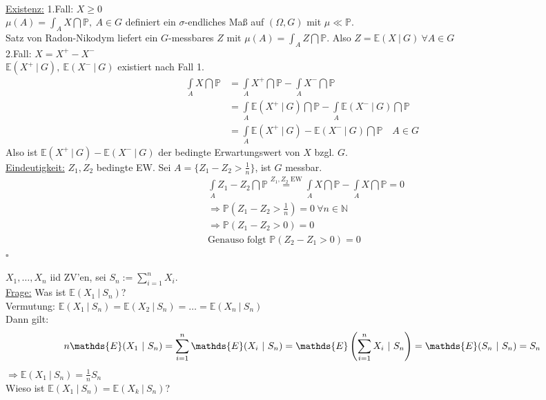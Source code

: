 \\
\uline{Existenz:} 1.Fall: $X\ge 0$\\
$\mu(A)=\int_AX\dint\mathds{P},~A\in G$ definiert ein $\sigma$-endliches Maß auf $(\Omega,G)$ mit $\mu \ll \mathds{P}$.\\
Satz von Radon-Nikodym liefert ein $G$-messbares $Z$ mit $\mu(A)=\int_A Z\dint\mathds{P}$. 
Also $Z=\mathds{E}(X~|~G)~\forall A\in G$\\
2.Fall: $X=X^+-X^-$\\
$\mathds{E}(X^+~|~G),~\mathds{E}(X^-~|~G)$ existiert nach Fall 1.
\begin{equation*}
\begin{aligned}
	\int\limits_AX\dint\mathds{P} &= \int\limits_AX^+\dint\mathds{P}-\int\limits_AX^-\dint\mathds{P}\\
	&= \int\limits_A\mathds{E}(X^+~|~G)\dint\mathds{P}-\int\limits_A\mathds{E}(X^-~|~G)\dint\mathds{P}\\
	&= \int\limits_A\mathds{E}(X^+~|~G)-\mathds{E}(X^-~|~G)\dint\mathds{P}\quad A\in G
\end{aligned}
\end{equation*}
Also ist $\mathds{E}(X^+~|~G)-\mathds{E}(X^-~|~G)$ der bedingte Erwartungswert von $X$ bzgl. $G$.\\
\uline{Eindeutigkeit:} $Z_1,Z_2$ bedingte EW.
Sei $A=\{Z_1-Z_2>\frac{1}{n}\}$, ist $G$ messbar.
\begin{equation*}
\begin{aligned}
	&\int\limits_{A}Z_1-Z_2\dint\mathds{P}\stackrel{Z_1,Z_2\text{ EW}}{=} \int\limits_AX\dint\mathds{P}-\int\limits_AX\dint\mathds{P}=0\\
	&\Rightarrow \mathds{P}(Z_1-Z_2>\frac{1}{n})=0~\forall n\in \mathds{N}\\
	&\Rightarrow \mathds{P}(Z_1-Z_2>0)=0\\
	&\text{Genauso folgt } \mathds{P}(Z_2-Z_1>0)=0
\end{aligned}
\end{equation*}
\hfill $\square$

$X_1,\dots,X_n $ iid ZV'en, sei $S_n:=\sum_{i=1}^{n}X_i$.\\
\uline{Frage:} Was ist $\mathds{E}(X_1~|~S_n)$?\\
Vermutung: $\mathds{E}(X_1~|~S_n)=\mathds{E}(X_2~|~S_n)=\dots=\mathds{E}(X_n~|~S_n)$\\
Dann gilt: 
\[
n\mathds{E}(X_1~|~S_n)=\sum_{i=1}^{n}\mathds{E}(X_i~|~S_n)=\mathds{E}\enbrace{\sum_{i=1}^{n}X_i~|~S_n}=\mathds{E}(S_n~|~S_n)=S_n
\]
$\Rightarrow \mathds{E}(X_1~|~S_n)=\frac{1}{n}S_n$\\
Wieso ist $\mathds{E}(X_1~|~S_n)=\mathds{E}(X_k~|~S_n)$?\\

